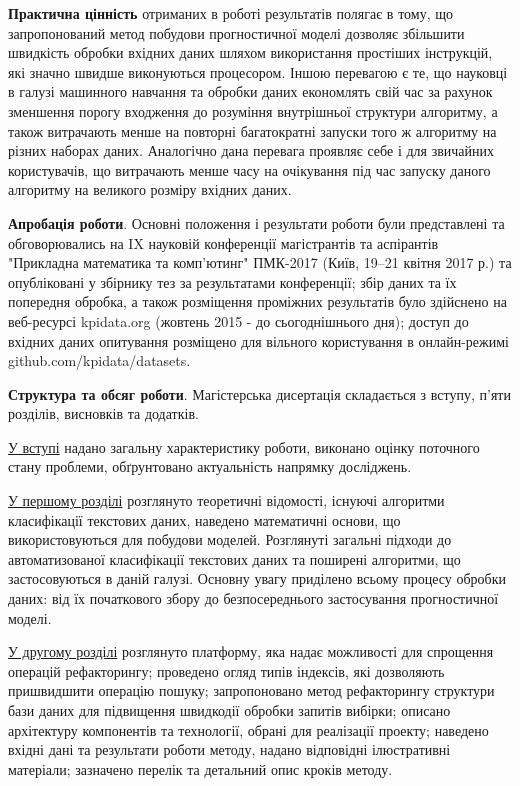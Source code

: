 \documentclass[14pt]{article}
\begin{document}
\textbf{Практична цінність} отриманих в роботі результатів полягає в тому,
що запропонований метод побудови прогностичної моделі дозволяє збільшити швидкість обробки вхідних даних шляхом використання простіших інструкцій, які значно швидше виконуються процесором. Іншою перевагою є те, що науковці в галузі машинного навчання та обробки даних економлять свій час за рахунок зменшення порогу входження до розуміння внутрішньої структури алгоритму, а також витрачають менше на повторні багатократні запуски того ж алгоритму на різних наборах даних. Аналогічно дана перевага проявляє себе і для звичайних користувачів, що витрачають менше часу на очікування під час запуску даного алгоритму на великого розміру вхідних даних.

\textbf{Апробація роботи}. Основні положення і результати роботи були представлені та обговорювались на IX науковій конференції магістрантів та аспірантів "Прикладна математика та комп’ютинг" ПМК-2017 (Київ,
19–21 квітня 2017 р.) та опубліковані у збірнику тез за результатами конференції; збір даних та їх попередня обробка, а також розміщення проміжних результатів було здійснено на веб-ресурсі kpidata.org (жовтень 2015 - до сьогоднішнього дня); доступ до вхідних даних опитування розміщено для вільного користування в онлайн-режимі github.com/kpidata/datasets.

\textbf{Структура та обсяг роботи}. Магістерська дисертація складається з вступу, п'яти розділів, висновків та додатків.

\underline{У вступі} надано загальну характеристику роботи, виконано оцінку поточного стану проблеми, обґрунтовано актуальність напрямку досліджень.

\underline{У першому розділі} розглянуто теоретичні відомості, існуючі алгоритми класифікації текстових даних, наведено математичні основи, що використовуються для побудови моделей. Розглянуті загальні підходи до автоматизованої класифікації текстових даних та поширені алгоритми, що застосовуються в даній галузі. Основну увагу приділено всьому процесу обробки даних: від їх початкового збору до безпосереднього застосування прогностичної моделі.

\underline{У другому розділі} розглянуто платформу, яка надає можливості для спрощення операцій рефакторингу; проведено огляд типів індексів, які дозволяють пришвидшити операцію пошуку; запропоновано метод рефакторингу структури бази даних для підвищення швидкодії обробки запитів вибірки; описано архітектуру компонентів та технології, обрані для реалізації проекту; наведено вхідні дані та результати роботи методу, надано відповідні ілюстративні матеріали; зазначено перелік та детальний опис кроків методу.
\end{document}
